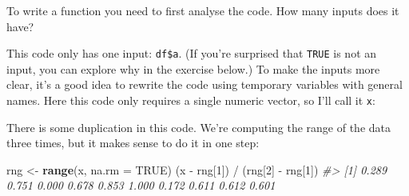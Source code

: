 \documentclass[]{book}
\newenvironment{Shaded}{\begin{snugshade}}{\end{snugshade}}
\newcommand{\KeywordTok}[1]{\textcolor[rgb]{0.13,0.29,0.53}{\textbf{{#1}}}}
\newcommand{\DataTypeTok}[1]{\textcolor[rgb]{0.13,0.29,0.53}{{#1}}}
\newcommand{\DecValTok}[1]{\textcolor[rgb]{0.00,0.00,0.81}{{#1}}}
\newcommand{\StringTok}[1]{\textcolor[rgb]{0.31,0.60,0.02}{{#1}}}
\newcommand{\CommentTok}[1]{\textcolor[rgb]{0.56,0.35,0.01}{\textit{{#1}}}}
\newcommand{\OtherTok}[1]{\textcolor[rgb]{0.56,0.35,0.01}{{#1}}}
\newcommand{\NormalTok}[1]{{#1}}
\begin{document}
To write a function you need to first analyse the code. How many inputs
does it have?

\begin{Shaded}
\end{Shaded}

This code only has one input: \texttt{df\$a}. (If you're surprised that
\texttt{TRUE} is not an input, you can explore why in the exercise
below.) To make the inputs more clear, it's a good idea to rewrite the
code using temporary variables with general names. Here this code only
requires a single numeric vector, so I'll call it \texttt{x}:

\begin{Shaded}
\end{Shaded}

There is some duplication in this code. We're computing the range of the
data three times, but it makes sense to do it in one step:

\begin{Shaded}
\begin{Highlighting}[]
\NormalTok{rng <-}\StringTok{ }\KeywordTok{range}\NormalTok{(x, }\DataTypeTok{na.rm =} \OtherTok{TRUE}\NormalTok{)}
\NormalTok{(x -}\StringTok{ }\NormalTok{rng[}\DecValTok{1}\NormalTok{]) /}\StringTok{ }\NormalTok{(rng[}\DecValTok{2}\NormalTok{] -}\StringTok{ }\NormalTok{rng[}\DecValTok{1}\NormalTok{])}
\CommentTok{#>  [1] 0.289 0.751 0.000 0.678 0.853 1.000 0.172 0.611 0.612 0.601}
\end{Highlighting}
\end{Shaded}
\end{document}
